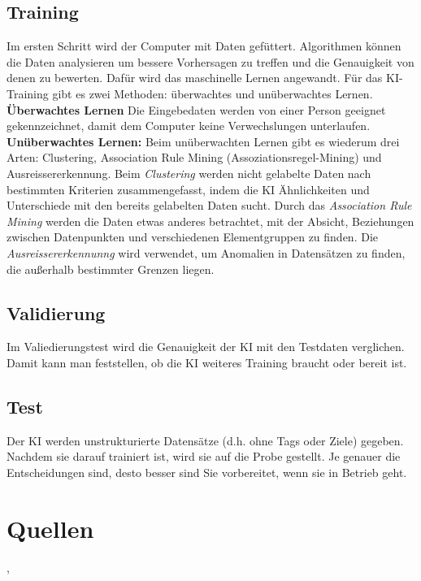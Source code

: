 \subsection{Training}
Im ersten Schritt wird der Computer mit Daten gefüttert. Algorithmen können die Daten analysieren um bessere Vorhersagen zu treffen und die Genauigkeit von denen zu bewerten. Dafür wird das maschinelle Lernen angewandt.
Für das KI-Training gibt es zwei Methoden: überwachtes und unüberwachtes Lernen.
\\
\textbf{Überwachtes Lernen} Die Eingebedaten werden von einer Person geeignet gekennzeichnet, damit dem Computer keine Verwechslungen unterlaufen.
\\
\textbf{Unüberwachtes Lernen:} Beim unüberwachten Lernen gibt es wiederum drei Arten:  Clustering, Association Rule Mining (Assoziationsregel-Mining) und Ausreissererkennung. Beim \textit{Clustering} werden nicht gelabelte Daten nach bestimmten Kriterien zusammengefasst, indem die KI Ähnlichkeiten und Unterschiede mit den bereits gelabelten Daten sucht.
Durch das \textit{Association Rule Mining} werden die Daten etwas anderes betrachtet, mit der Absicht, Beziehungen zwischen Datenpunkten und verschiedenen Elementgruppen zu finden.
Die \textit{Ausreissererkennunng} wird verwendet, um Anomalien in Datensätzen zu finden, die außerhalb bestimmter Grenzen liegen.

\subsection{Validierung}
Im Valiedierungstest wird die Genauigkeit der KI mit den Testdaten verglichen. Damit kann man feststellen, ob die KI weiteres Training braucht oder bereit ist.

\subsection{Test}
Der KI werden unstrukturierte Datensätze (d.h. ohne Tags oder Ziele) gegeben. Nachdem sie darauf trainiert ist, wird sie auf die Probe gestellt. Je genauer die Entscheidungen sind, desto besser sind Sie vorbereitet, wenn sie in Betrieb geht.

\section{Quellen} \citep{KI-Training}, \citep{neuronale-netze}